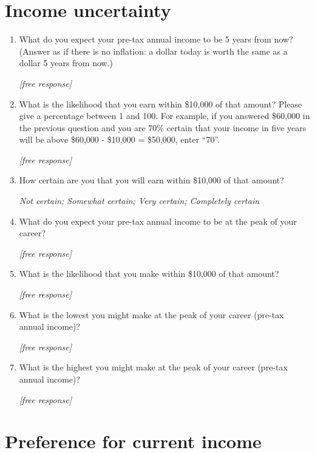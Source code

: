 \documentclass[11pt, headsepline]{article}
\begin{document}
\section{Income uncertainty}

\begin{enumerate}[resume]
    \item What do you expect your pre-tax annual income to be 5 years from now? (Answer as if there is no inflation: a dollar today is worth the same as a dollar 5 years from now.)

    \textit{[free response]}

    \item What is the likelihood that you earn within \$10,000 of that amount? Please give a percentage between 1 and 100. For example, if you answered \$60,000 in the previous question and you are 70\% certain that your income in five years will be above \$60,000 - \$10,000 = \$50,000, enter ``70''.

    \textit{[free response]}

    \item How certain are you that you will earn within \$10,000 of that amount?

    \textit{Not certain; Somewhat certain; Very certain; Completely certain}

    \item What do you expect your pre-tax annual income to be at the peak of your career?

    \textit{[free response]}

    \item What is the likelihood that you make within \$10,000 of that amount?

    \textit{[free response]}

    \item What is the lowest you might make at the peak of your career (pre-tax annual income)?

    \textit{[free response]}

    \item What is the highest you might make at the peak of your career (pre-tax annual income)?
    
    \textit{[free response]}
\end{enumerate}

\section{Preference for current income}
\end{document}
